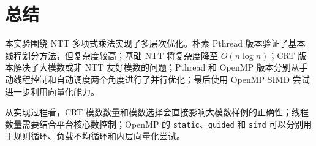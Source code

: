 \documentclass[UTF8,a4paper,12pt]{ctexart}
\begin{document}
\section{总结}

本实验围绕 NTT 多项式乘法实现了多层次优化。朴素 Pthread 版本验证了基本线程划分方法，但复杂度较高；基础 NTT 将复杂度降至 $O(n\log n)$；CRT 版本解决了大模数或非 NTT 友好模数的问题；Pthread 和 OpenMP 版本分别从手动线程控制和自动调度两个角度进行了并行优化；最后使用 OpenMP SIMD 尝试进一步利用向量化能力。

从实现过程看，CRT 模数数量和模数选择会直接影响大模数样例的正确性；线程数量需要结合平台核心数控制；OpenMP 的 \texttt{static}、\texttt{guided} 和 \texttt{simd} 可以分别用于规则循环、负载不均循环和内层向量化尝试。
\end{document}
